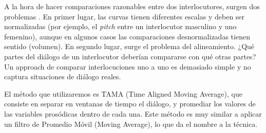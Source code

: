 A la hora de hacer comparaciones razonables entre dos interlocutores, surgen dos problemas \cite{KOU2008}. En primer lugar, las curvas tienen diferentes escalas y deben ser normalizadas (por ejemplo, el \emph{pitch} entre un interlocutor masculino y uno femenino), aunque en algunos casos
las comparaciones desnormalizadas tienen sentido (volumen). En segundo lugar, surge el problema del alineamiento. ¿Qué partes del diálogo de un interlocutor deberían compararse con qué otras partes? Un approach de comparar interlocuciones uno a uno es demasiado simple y no captura situaciones de diálogo reales.

El método que utilizaremos es TAMA (Time Aligned Moving Average), que consiste en separar en ventanas de tiempo el diálogo, y promediar los valores de las variables prosódicas dentro de cada una. Este método es muy similar a aplicar un filtro de Promedio Móvil (Moving Average), lo que da el nombre a la técnica.

